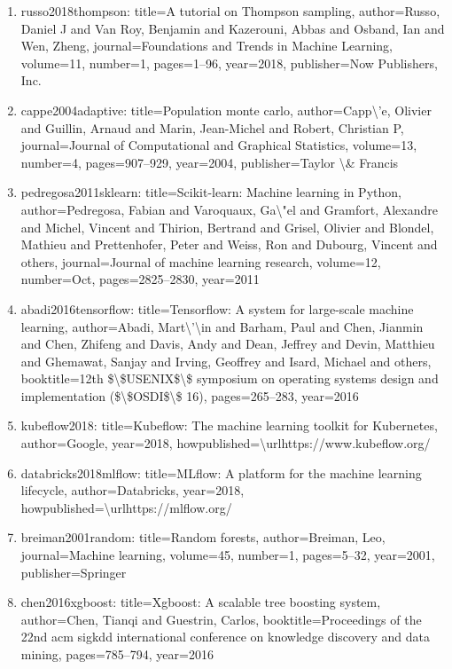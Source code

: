 \documentclass[11pt]{article}
\begin{document}
\begin{enumerate}[leftmargin=*]
  \item russo2018thompson: title=A tutorial on Thompson sampling, author=Russo, Daniel J and Van Roy, Benjamin and Kazerouni, Abbas and Osband, Ian and Wen, Zheng, journal=Foundations and Trends in Machine Learning, volume=11, number=1, pages=1--96, year=2018, publisher=Now Publishers, Inc.
  \item cappe2004adaptive: title=Population monte carlo, author=Capp\textbackslash{}'e, Olivier and Guillin, Arnaud and Marin, Jean-Michel and Robert, Christian P, journal=Journal of Computational and Graphical Statistics, volume=13, number=4, pages=907--929, year=2004, publisher=Taylor \textbackslash{}\& Francis
  \item pedregosa2011sklearn: title=Scikit-learn: Machine learning in Python, author=Pedregosa, Fabian and Varoquaux, Ga\textbackslash{}"el and Gramfort, Alexandre and Michel, Vincent and Thirion, Bertrand and Grisel, Olivier and Blondel, Mathieu and Prettenhofer, Peter and Weiss, Ron and Dubourg, Vincent and others, journal=Journal of machine learning research, volume=12, number=Oct, pages=2825--2830, year=2011
  \item abadi2016tensorflow: title=Tensorflow: A system for large-scale machine learning, author=Abadi, Mart\textbackslash{}'\textbackslash{}in and Barham, Paul and Chen, Jianmin and Chen, Zhifeng and Davis, Andy and Dean, Jeffrey and Devin, Matthieu and Ghemawat, Sanjay and Irving, Geoffrey and Isard, Michael and others, booktitle=12th \$\textbackslash{}\$USENIX\$\textbackslash{}\$ symposium on operating systems design and implementation (\$\textbackslash{}\$OSDI\$\textbackslash{}\$ 16), pages=265--283, year=2016
  \item kubeflow2018: title=Kubeflow: The machine learning toolkit for Kubernetes, author=Google, year=2018, howpublished=\textbackslash{}urlhttps://www.kubeflow.org/
  \item databricks2018mlflow: title=MLflow: A platform for the machine learning lifecycle, author=Databricks, year=2018, howpublished=\textbackslash{}urlhttps://mlflow.org/
  \item breiman2001random: title=Random forests, author=Breiman, Leo, journal=Machine learning, volume=45, number=1, pages=5--32, year=2001, publisher=Springer
  \item chen2016xgboost: title=Xgboost: A scalable tree boosting system, author=Chen, Tianqi and Guestrin, Carlos, booktitle=Proceedings of the 22nd acm sigkdd international conference on knowledge discovery and data mining, pages=785--794, year=2016

\end{enumerate}
\end{document}
